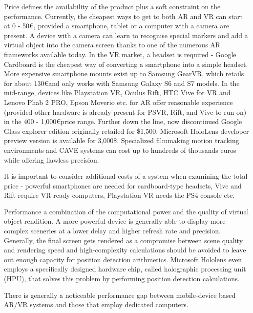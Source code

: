 \documentclass[12pt, a4paper]{article}
\newenvironment{definitions}
{\begin{description}[style=nextline]}
{\end{description}}
\begin{document}
\begin{definitions}
\item[Price] defines the availability of the product plus a soft constraint on the performance. Currently, the cheapest ways to get to both AR and VR can start at 0 - 50\euro, provided a smartphone, tablet or a computer with a camera are present. A device with a camera can learn to recognise special markers and add a virtual object into the camera screen thanks to one of the numerous AR frameworks available today. In the VR market, a headset is required - Google Cardboard is the cheapest way of converting a smartphone into a simple headset. More expensive smartphone mounts exist up to Samsung GearVR, which retails for about 130\euro and only works with Samsung Galaxy S6 and S7 models. In the mid-range, devices like Playstation VR, Oculus Rift, HTC Vive for VR and Lenovo Phab 2 PRO, Epson Moverio etc. for AR offer reasonable experience (provided other hardware is already present for PSVR, Rift, and Vive to run on) in the 400 - 1,000\euro price range. Further down the line, now discontinued Google Glass explorer edition originally retailed for \$1,500, Microsoft HoloLens developer preview version is available for 3,000\$. Specialized filmmaking motion tracking environments and CAVE systems can cost up to hundreds of thousands euros while offering flawless precision.

It is important to consider additional costs of a system when examining the total price - powerful smartphones are needed for cardboard-type headsets, Vive and Rift require VR-ready computers, Playstation VR needs the PS4 console etc.
\item[Performance]a combination of the computational power and the quality of virtual object rendition. A more powerful device is generally able to display more complex sceneries at a lower delay and higher refresh rate and precision. Generally, the final screen gets rendered as a compromise between scene quality and rendering speed and high-complexity calculations should be avoided to leave out enough capacity for position detection arithmetics. Microsoft Hololens even employs a specifically designed hardware chip, called holographic processing unit (HPU), that solves this problem by performing position detection calculations.

There is generally a noticeable performance gap between mobile-device based AR/VR systems and those that employ dedicated computers.
\end{definitions}

\nocite{*}
\printbibliography
\end{document}
